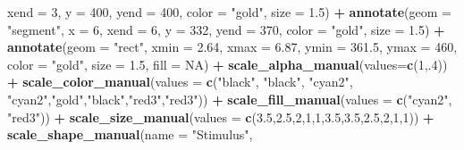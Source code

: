 \documentclass[
]{article}
\newenvironment{Shaded}{\begin{snugshade}}{\end{snugshade}}
\newcommand{\DataTypeTok}[1]{\textcolor[rgb]{0.13,0.29,0.53}{#1}}
\newcommand{\DecValTok}[1]{\textcolor[rgb]{0.00,0.00,0.81}{#1}}
\newcommand{\FloatTok}[1]{\textcolor[rgb]{0.00,0.00,0.81}{#1}}
\newcommand{\KeywordTok}[1]{\textcolor[rgb]{0.13,0.29,0.53}{\textbf{#1}}}
\newcommand{\NormalTok}[1]{#1}
\newcommand{\OperatorTok}[1]{\textcolor[rgb]{0.81,0.36,0.00}{\textbf{#1}}}
\newcommand{\OtherTok}[1]{\textcolor[rgb]{0.56,0.35,0.01}{#1}}
\newcommand{\StringTok}[1]{\textcolor[rgb]{0.31,0.60,0.02}{#1}}
\begin{document}
\begin{Shaded}
\begin{Highlighting}[]
           \DataTypeTok{xend =} \DecValTok{3}\NormalTok{, }
           \DataTypeTok{y =} \DecValTok{400}\NormalTok{, }
           \DataTypeTok{yend =} \DecValTok{400}\NormalTok{, }
           \DataTypeTok{color =} \StringTok{"gold"}\NormalTok{,}
           \DataTypeTok{size =} \FloatTok{1.5}\NormalTok{) }\OperatorTok{+}
\StringTok{  }\KeywordTok{annotate}\NormalTok{(}\DataTypeTok{geom =} \StringTok{"segment"}\NormalTok{, }
           \DataTypeTok{x =} \DecValTok{6}\NormalTok{, }
           \DataTypeTok{xend =} \DecValTok{6}\NormalTok{, }
           \DataTypeTok{y =} \DecValTok{332}\NormalTok{, }
           \DataTypeTok{yend =} \DecValTok{370}\NormalTok{, }
           \DataTypeTok{color =} \StringTok{"gold"}\NormalTok{,}
           \DataTypeTok{size =} \FloatTok{1.5}\NormalTok{) }\OperatorTok{+}
\StringTok{  }\KeywordTok{annotate}\NormalTok{(}\DataTypeTok{geom =} \StringTok{"rect"}\NormalTok{, }
           \DataTypeTok{xmin =} \FloatTok{2.64}\NormalTok{, }
           \DataTypeTok{xmax =} \FloatTok{6.87}\NormalTok{, }
           \DataTypeTok{ymin =} \FloatTok{361.5}\NormalTok{, }
           \DataTypeTok{ymax =} \DecValTok{460}\NormalTok{, }
           \DataTypeTok{color =} \StringTok{"gold"}\NormalTok{,}
           \DataTypeTok{size =} \FloatTok{1.5}\NormalTok{,}
           \DataTypeTok{fill =} \OtherTok{NA}\NormalTok{) }\OperatorTok{+}
\StringTok{  }\KeywordTok{scale_alpha_manual}\NormalTok{(}\DataTypeTok{values=}\KeywordTok{c}\NormalTok{(}\DecValTok{1}\NormalTok{,.}\DecValTok{4}\NormalTok{)) }\OperatorTok{+}
\StringTok{  }\KeywordTok{scale_color_manual}\NormalTok{(}\DataTypeTok{values =} \KeywordTok{c}\NormalTok{(}\StringTok{"black"}\NormalTok{, }\StringTok{"black"}\NormalTok{, }\StringTok{"cyan2"}\NormalTok{, }\StringTok{"cyan2"}\NormalTok{,}\StringTok{"gold"}\NormalTok{,}\StringTok{"black"}\NormalTok{,}\StringTok{"red3"}\NormalTok{,}\StringTok{"red3"}\NormalTok{)) }\OperatorTok{+}
\StringTok{  }\KeywordTok{scale_fill_manual}\NormalTok{(}\DataTypeTok{values =} \KeywordTok{c}\NormalTok{(}\StringTok{"cyan2"}\NormalTok{, }\StringTok{"red3"}\NormalTok{)) }\OperatorTok{+}
\StringTok{  }\KeywordTok{scale_size_manual}\NormalTok{(}\DataTypeTok{values =} \KeywordTok{c}\NormalTok{(}\FloatTok{3.5}\NormalTok{,}\FloatTok{2.5}\NormalTok{,}\DecValTok{2}\NormalTok{,}\DecValTok{1}\NormalTok{,}\DecValTok{1}\NormalTok{,}\FloatTok{3.5}\NormalTok{,}\FloatTok{3.5}\NormalTok{,}\FloatTok{2.5}\NormalTok{,}\DecValTok{2}\NormalTok{,}\DecValTok{1}\NormalTok{,}\DecValTok{1}\NormalTok{)) }\OperatorTok{+}
\StringTok{  }\KeywordTok{scale_shape_manual}\NormalTok{(}\DataTypeTok{name =} \StringTok{"Stimulus"}\NormalTok{, }

\end{Highlighting}
\end{Shaded}
\end{document}
